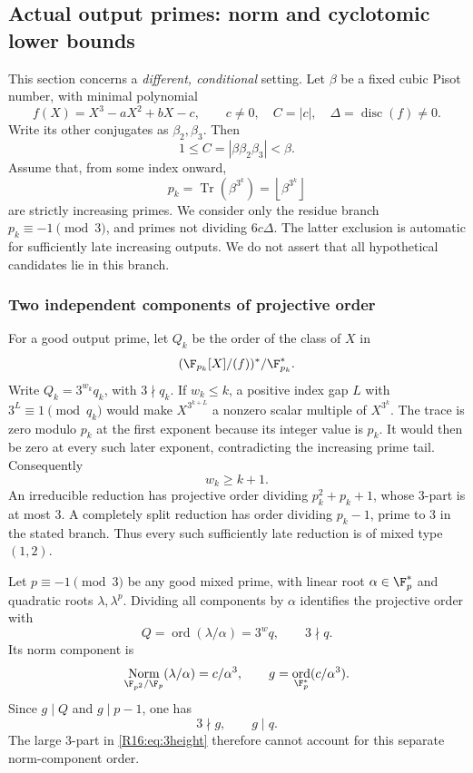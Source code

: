 \documentclass[11pt,a4paper]{article}
\theoremstyle{definition}\newtheorem{definition}[theorem]{Definition}
\theoremstyle{remark}\newtheorem{remark}[theorem]{Remark}
\newcommand{\floor}[1]{\left\lfloor#1\right\rfloor}
\DeclareMathOperator{\Tr}{Tr}\DeclareMathOperator{\tr}{tr}\DeclareMathOperator{\Nm}{N}
\DeclareMathOperator{\Norm}{Norm}\DeclareMathOperator{\ord}{ord}\DeclareMathOperator{\Gal}{Gal}
\begin{document}
\subsection{Actual output primes: norm and cyclotomic lower bounds}

This section concerns a \emph{different, conditional} setting. Let $\beta$
be a fixed cubic Pisot number, with minimal polynomial
\[
 f(X)=X^3-aX^2+bX-c,\qquad
 c\ne0,\quad C=|c|,\quad\Delta=\operatorname{disc}(f)\ne0.
\]
Write its other conjugates as $\beta_2,\beta_3$. Then
\begin{equation}\label{R16:eq:Csize}
 1\le C=|\beta\beta_2\beta_3|<\beta.
\end{equation}
Assume that, from some index onward,
\begin{equation}\label{R16:eq:primetail}
 p_k=\Tr(\beta^{3^k})=\floor{\beta^{3^k}}
\end{equation}
are strictly increasing primes. We consider only the residue branch
$p_k\equiv-1\pmod3$, and primes not dividing $6c\Delta$. The latter
exclusion is automatic for sufficiently late increasing outputs.
We do not assert that all hypothetical candidates lie in this branch.

\subsubsection{Two independent components of projective order}

For a good output prime, let $Q_k$ be the order of the class of $X$ in
\[
 (\F_{p_k}[X]/(f))^*/\F_{p_k}^*.
\]
Write $Q_k=3^{w_k}q_k$, with $3\nmid q_k$.
If $w_k\le k$, a positive index gap $L$ with $3^L\equiv1\pmod{q_k}$
would make $X^{3^{k+L}}$ a nonzero scalar multiple of $X^{3^k}$.
The trace is zero modulo $p_k$ at the first exponent because its integer
value is $p_k$. It would then be zero at every such later exponent,
contradicting the increasing prime tail. Consequently
\begin{equation}\label{R16:eq:3height}
 w_k\ge k+1.
\end{equation}
An irreducible reduction has projective order dividing $p_k^2+p_k+1$,
whose $3$-part is at most $3$. A completely split reduction has order
dividing $p_k-1$, prime to $3$ in the stated branch. Thus every such
sufficiently late reduction is of mixed type $(1,2)$.

Let $p\equiv-1\pmod3$ be any good mixed prime, with linear root
$\alpha\in\F_p^*$ and quadratic roots $\lambda,\lambda^p$.
Dividing all components by $\alpha$ identifies the projective order with
\[
 Q=\ord(\lambda/\alpha)=3^wq,\qquad3\nmid q.
\]
Its norm component is
\[
 \Norm_{\F_{p^2}/\F_p}(\lambda/\alpha)=c/\alpha^3,
 \qquad g=\ord_{\F_p^*}(c/\alpha^3).
\]
Since $g\mid Q$ and $g\mid p-1$, one has
\begin{equation}\label{R16:eq:gdiv}
 3\nmid g,\qquad g\mid q.
\end{equation}
The large $3$-part in \eqref{R16:eq:3height} therefore cannot account for this
separate norm-component order.
\end{document}
